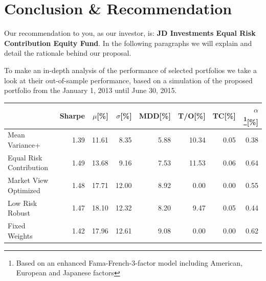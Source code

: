 \documentclass[11pt, parskip=full, DIV=14, headings=small, footsepline, footinclude=false, headsepline]{scrreprt}
\newlength{\oldintextsep}
\begin{document}
\setlength{\intextsep}{\oldintextsep}
\chapter{Conclusion \& Recommendation}
Our recommendation to you, as our investor, is: \textbf{JD Investments Equal Risk Contribution Equity Fund}. 
In the following paragraphs we will explain and detail the rationale behind our proposal.

To make an in-depth analysis of the performance of selected portfolios we take a look at their out-of-sample performance, based on a simulation of the proposed portfolio from the January 1, 2013 until June 30, 2015.

\begin{table}[ht]
\centering
\begin{tabular}{lrrrrrrr}
\toprule
                      & Sharpe & $\mu$[\%] &$\sigma$[\%]& MDD[\%]& T/O[\%] & TC[\%] & $\alpha$\footnote{Based on an enhanced Fama-French-3-factor model including American, European and Japanese factors}[\%] \\ 
\midrule
 Mean Variance+ & 1.39 & 11.61 & 8.35 & 5.88 & 10.34 & 0.05 & 0.38 \\
 Equal Risk Contribution& 1.49 & 13.68 & 9.16 & 7.53 & 11.53 & 0.06 & 0.64 \\ 
 Market View Optimized & 1.48 & 17.71 & 12.00 & 8.92 & 0.00 & 0.00 & 0.55 \\ 
 Low Risk Robust & 1.47 & 18.10 & 12.32 & 8.20 & 9.47 & 0.05 & 0.44 \\ 
 Fixed Weights & 1.42 & 17.96 & 12.61 & 9.08 & 0.00 & 0.00 & 0.62 \\ 
 \bottomrule
\end{tabular}
\end{table}
\end{document}
